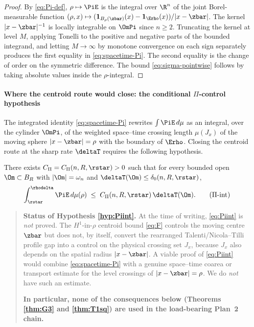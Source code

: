 \begin{proof}
By \eqref{eq:Pi-def}, $\rho\mapsto\PiE$ is the integral over $\R^{n}$
of the joint Borel-measurable function
$(\rho,x)\mapsto(\mathbf{1}_{B_{\rho}(\zbar)}(x)-\mathbf{1}_{\Erho}(x))/|x-\zbar|$.
The kernel $|x-\zbar|^{-1}$ is locally integrable on $\OmPi$ since
$n\ge 2$. Truncating the kernel at level $M$, applying Tonelli to the
positive and negative parts of the bounded integrand, and letting
$M\to\infty$ by monotone convergence on each sign separately produces
the first equality in \eqref{eq:spacetime-Pi}. The second equality is
the change of order on the symmetric difference. The bound
\eqref{eq:sigma-pointwise} follows by taking absolute values inside
the $\rho$-integral.
\end{proof}

\paragraph{Where the centroid route would close: the conditional
\texorpdfstring{$\Pi$}{Pi}-control hypothesis}

The integrated identity \eqref{eq:spacetime-Pi} rewrites
$\int\PiE\,d\mu$ as an integral, over the cylinder $\OmPi$, of the
weighted space--time crossing length $\mu(J_{x})$ of the moving sphere
$|x-\zbar|=\rho$ with the boundary of $\Erho$. Closing the centroid
route at the sharp rate $\deltaT$ requires the following hypothesis.

\begin{hypothesis}\label{hyp:Piint}
There exists $C_{\Pi}=C_{\Pi}(n,R,\rstar)>0$ such that for every
bounded open $\Om\subset B_{R}$ with $|\Om|=\omega_{n}$ and
$\deltaT(\Om)\le\delta_{0}(n,R,\rstar)$,
\begin{equation}\label{eq:Piint}
   \int_{\rstar}^{\rhodelta}\PiE\,d\mu(\rho)
   \;\le\;
   C_{\Pi}(n,R,\rstar)\,\deltaT(\Om).
   \tag{$\Pi$-int}
\end{equation}
\end{hypothesis}

\begin{quote}\small
\textbf{Status of Hypothesis \ref{hyp:Piint}.}
At the time of writing, \eqref{eq:Piint} is \emph{not} proved. The
$H^{1}$-in-$\rho$ centroid bound \eqref{eq:F} controls the moving
centre $\zbar$ but does not, by itself, convert the rearranged
Talenti/Nicola--Tilli profile gap into a control on the physical
crossing set $J_{x}$, because $J_{x}$ also depends on the spatial
radius $|x-\zbar|$. A viable proof of \eqref{eq:Piint} would combine
\eqref{eq:spacetime-Pi} with a genuine space--time coarea or
transport estimate for the level crossings of
$|x-\zbar|=\rho$. We do \emph{not} have such an estimate.

\textbf{In particular, none of the consequences below
(Theorems \ref{thm:G3} and \ref{thm:T1sq}) are used in the
load-bearing Plan~2 chain.}
\end{quote}

